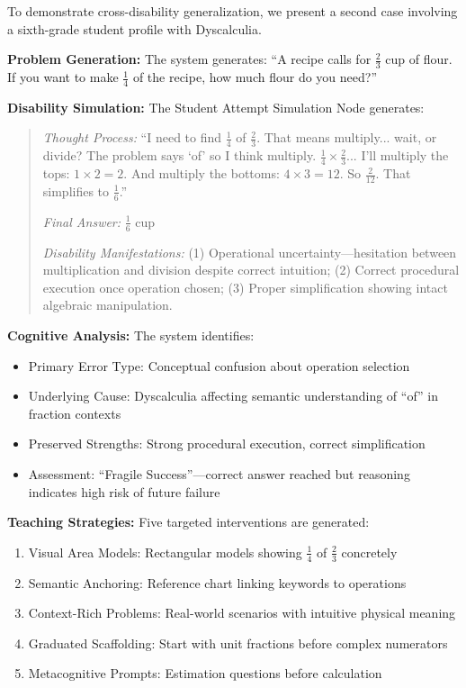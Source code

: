\documentclass[11pt]{article}
\begin{document}
To demonstrate cross-disability generalization, we present a second case involving a sixth-grade student profile with Dyscalculia.

\textbf{Problem Generation:} The system generates: ``A recipe calls for $\frac{2}{3}$ cup of flour. If you want to make $\frac{1}{4}$ of the recipe, how much flour do you need?''

\textbf{Disability Simulation:} The Student Attempt Simulation Node generates:

\begin{quote}
\textit{Thought Process:} ``I need to find $\frac{1}{4}$ of $\frac{2}{3}$. That means multiply... wait, or divide? The problem says `of' so I think multiply. $\frac{1}{4} \times \frac{2}{3}$... I'll multiply the tops: $1 \times 2 = 2$. And multiply the bottoms: $4 \times 3 = 12$. So $\frac{2}{12}$. That simplifies to $\frac{1}{6}$.''

\textit{Final Answer:} $\frac{1}{6}$ cup

\textit{Disability Manifestations:} (1) Operational uncertainty---hesitation between multiplication and division despite correct intuition; (2) Correct procedural execution once operation chosen; (3) Proper simplification showing intact algebraic manipulation.
\end{quote}

\textbf{Cognitive Analysis:} The system identifies:
\begin{itemize}
    \item Primary Error Type: Conceptual confusion about operation selection
    \item Underlying Cause: Dyscalculia affecting semantic understanding of ``of'' in fraction contexts
    \item Preserved Strengths: Strong procedural execution, correct simplification
    \item Assessment: ``Fragile Success''---correct answer reached but reasoning indicates high risk of future failure
\end{itemize}

\textbf{Teaching Strategies:} Five targeted interventions are generated:
\begin{enumerate}
    \item Visual Area Models: Rectangular models showing $\frac{1}{4}$ of $\frac{2}{3}$ concretely
    \item Semantic Anchoring: Reference chart linking keywords to operations
    \item Context-Rich Problems: Real-world scenarios with intuitive physical meaning
    \item Graduated Scaffolding: Start with unit fractions before complex numerators
    \item Metacognitive Prompts: Estimation questions before calculation
\end{enumerate}
\end{document}
